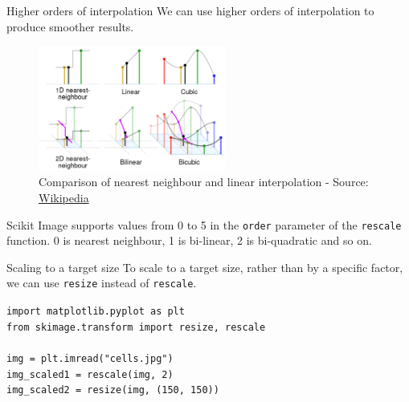 \documentclass[9pt, aspectratio=169]{beamer}
\begin{document}
\begin{frame}
    {Higher orders of interpolation}
    We can use higher orders of interpolation to produce smoother results. \\
    \begin{figure}

        \centering
        \includegraphics[width=0.55\textwidth]{interpolations.png}
        \caption{Comparison of nearest neighbour and linear interpolation - Source: \href{https://en.wikipedia.org/wiki/Nearest-neighbor_interpolation}{Wikipedia}}
    \end{figure}

    Scikit Image supports values from 0 to 5 in the \texttt{order} parameter of the \texttt{rescale} function. 0 is nearest neighbour, 1 is bi-linear, 2 is bi-quadratic and so on.
\end{frame}

\begin{frame}
    {Scaling to a target size}
    To scale to a target size, rather than by a specific factor, we can use \texttt{resize} instead of \texttt{rescale}.

    \begin{codebox}
        \texttt{import matplotlib.pyplot as plt\\
            from skimage.transform import resize, rescale\\
            \\
            \texttt{img = plt.imread(}"cells.jpg")\\
            \texttt{img\_scaled1 = rescale(}img, 2)\\
            img\_scaled2 = resize(img, (150, 150))
        }
    \end{codebox}
\end{frame}
\end{document}

